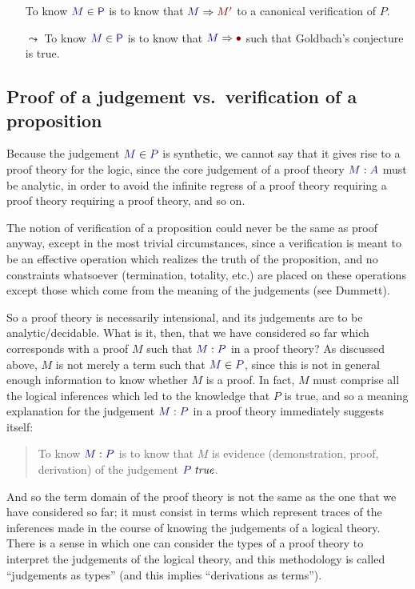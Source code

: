 \documentclass[main.tex]{subfiles}
\begin{document}
\begin{itemize}
  \item[] To know $\ver{M}{\mathsf{P}}$ is to know that $\reduce{M}{M'}$ to a
    canonical verification of $P$.
  \item[$\leadsto$] To know $\ver{M}{\mathsf{P}}$ is to know that
    $\reduce{M}{\bullet}$ such that Goldbach's conjecture is true.
\end{itemize}

\subsection{Proof of a judgement vs.\ verification of a proposition}

Because the judgement $\ver{M}{P}$ is synthetic, we cannot say that it
gives rise to a proof theory for the logic, since the core judgement
of a proof theory $\ofty{M}{A}$ must be analytic, in order to avoid the
infinite regress of a proof theory requiring a proof theory requiring
a proof theory, and so on.

The notion of verification of a proposition could never be the same as
proof anyway, except in the most trivial circumstances, since a
verification is meant to be an effective operation which realizes the
truth of the proposition, and no constraints whatsoever (termination,
totality, etc.) are placed on these operations except those which come
from the meaning of the judgements (see Dummett).


So a proof theory is necessarily intensional, and its judgements are to be
analytic/decidable. What is it, then, that we have considered so far which
corresponds with a proof $M$ such that $\ofty{M}{P}$ in a proof theory? As discussed
above, $M$ is not merely a term such that $\ver{M}{P}$, since this is not in
general enough information to know whether $M$ is a proof. In fact, $M$ must
comprise all the logical inferences which led to the knowledge that $P$ is
true, and so a meaning explanation for the judgement $\ofty{M}{P}$ in a proof theory
immediately suggests itself:
\begin{quote}
  To know $\ofty{M}{P}$ is to know that $M$ is evidence (demonstration, proof,
  derivation) of the judgement $\istrue{P}$.
\end{quote}

And so the term domain of the proof theory is not the same as the one that we
have considered so far; it must consist in terms which represent traces of the
inferences made in the course of knowing the judgements of a logical theory.
There is a sense in which one can consider the types of a proof theory to
interpret the judgements of the logical theory, and this methodology is called
``judgements as types'' (and this implies ``derivations as terms'').
\end{document}
